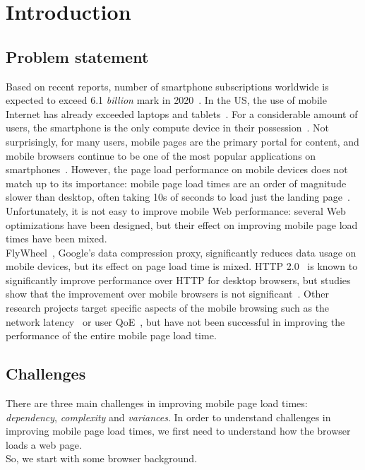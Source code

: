 \chapter{Introduction}\label{ch:introduction}

\section{Problem statement}\label{problemstatement}
Based on recent reports, number of smartphone subscriptions worldwide is expected to  exceed 6.1  {\em billion} mark in 2020~\cite{ericcson_report}. In the US, the use of mobile Internet has already exceeded  laptops and tablets~\cite{mobile-overtake}. For a considerable amount of users, the smartphone is the only compute device in their possession~\cite{mobile-only}. Not surprisingly, for many users, mobile pages are the primary portal for content, and mobile browsers continue to be one of the most popular applications on smartphones~\cite{charlie_mobicom2015}. However, the page load performance on mobile devices does not match up to its importance: mobile page load times are an order of magnitude slower than desktop, often taking 10s of seconds to load just the landing page~\cite{klotski}.\\

\noindent Unfortunately, it is not easy to improve mobile Web performance: several Web optimizations have been designed, but their effect on improving mobile page load times have been mixed. \\
FlyWheel~\cite{flywheel}, Google's data compression proxy, significantly reduces data usage on mobile devices, but its effect on page load time is mixed. HTTP 2.0~\cite{spdy} is known to significantly improve performance over HTTP for desktop browsers, but studies show that the improvement over mobile browsers is not significant~\cite{spydier}. Other research projects target specific aspects of the mobile browsing such as the network latency~\cite{parcel} or user QoE~\cite{klotski}, but have not been successful in improving the performance of the entire mobile page load time.

\section{Challenges}

There are three main challenges in improving mobile page load times: {\em  dependency}, {\em complexity} and {\em variances}. In order to understand challenges in improving mobile page load times, we first need to understand how the browser loads a web page.\\
\noindent So, we start with some browser background. 
